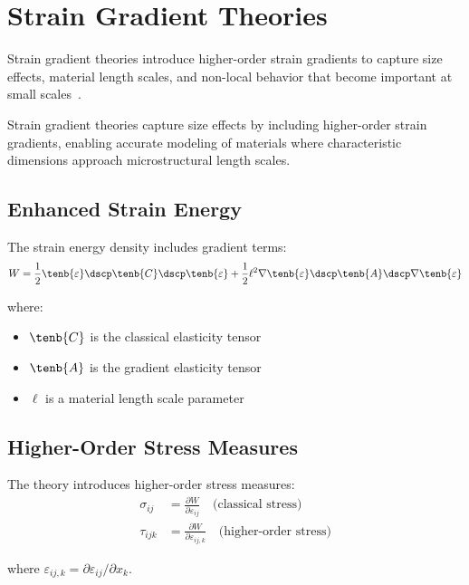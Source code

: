 \section{Strain Gradient Theories}

Strain gradient theories introduce higher-order strain gradients to capture size effects, material length scales, and non-local behavior that become important at small scales~\autocite{Sadd.2019}.

\begin{keypoint}
Strain gradient theories capture size effects by including higher-order strain gradients, enabling accurate modeling of materials where characteristic dimensions approach microstructural length scales.
\end{keypoint}

\subsection{Enhanced Strain Energy}

The strain energy density includes gradient terms:
\begin{equation}
W = \frac{1}{2} \tenb{\varepsilon} \dscp \tenb{C} \dscp \tenb{\varepsilon} + \frac{1}{2} \ell^2 \nabla \tenb{\varepsilon} \dscp \tenb{A} \dscp \nabla \tenb{\varepsilon}
\end{equation}

where:
\begin{itemize}
\item $\tenb{C}$ is the classical elasticity tensor
\item $\tenb{A}$ is the gradient elasticity tensor
\item $\ell$ is a material length scale parameter
\end{itemize}

\subsection{Higher-Order Stress Measures}

The theory introduces higher-order stress measures:
\begin{align}
\sigma_{ij} &= \frac{\partial W}{\partial \varepsilon_{ij}} \quad \text{(classical stress)}\\
\tau_{ijk} &= \frac{\partial W}{\partial \varepsilon_{ij,k}} \quad \text{(higher-order stress)}
\end{align}

where $\varepsilon_{ij,k} = \partial \varepsilon_{ij}/\partial x_k$.

